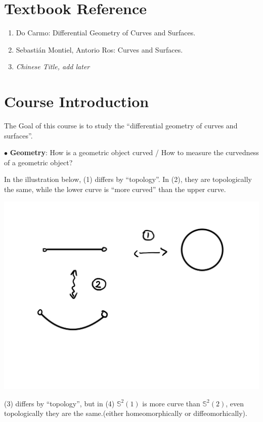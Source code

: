 \section*{Textbook Reference}
\begin{enumerate}[(1)]
    \item Do Carmo: Differential Geometry of Curves and Surfaces.
    \item Sebasti\'an Montiel, Antorio Ros: Curves and Surfaces.
    \item \textit{Chinese Title, add later}
\end{enumerate}
\section*{Course Introduction}
The Goal of this course is to study the ``differential geometry of curves and surfaces''.

\noindent
$\bullet$ \textbf{Geometry}: How is a geometric object curved / How to measure the curvedness of a geometric object? 
\begin{exam}
     In the illustration below, (1) differs by ``topology''. In (2), they are topologically the same, while the lower curve is ``more curved'' than the upper curve.
\end{exam}

\begin{center}
    \includegraphics[scale=0.3]{picture/preface_example1.jpg}
\end{center}

\begin{exam}
    (3) differs by ``topology'', but in (4) $\mathbb{S}^2(1)$ is more curve than $\mathbb{S}^2(2)$, even topologically they are the same.(either homeomorphically or diffeomorhically).
\end{exam}

